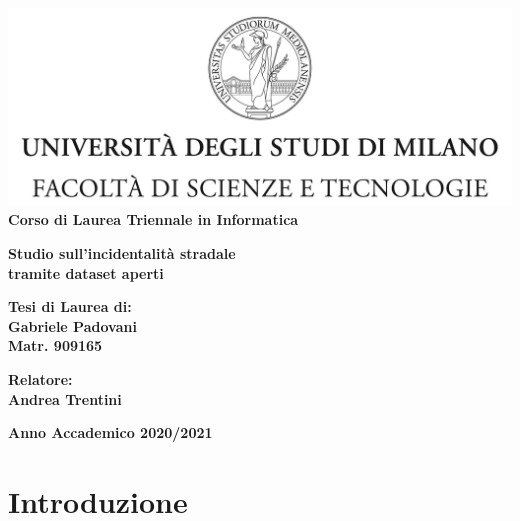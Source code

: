 \documentclass[a4paper]{report}
\begin{document}
\begin{titlepage}
\begin{center}
\includegraphics[width=\textwidth]{Logo.jpg}\\
{\large{\bf Corso di Laurea Triennale in Informatica}}
\end{center}
\vspace{12mm}
\begin{center}
{\huge{\bf Studio sull'incidentalità stradale}}\\
\vspace{4mm}
{\huge{\bf tramite dataset aperti}}\\
\end{center}
\vspace{12mm}
\begin{flushright}
{\large{\bf Tesi di Laurea di:}}\\
{\large{\bf Gabriele Padovani}}\\
{\large{\bf Matr. 909165}}\\
\end{flushright}
\vspace{4mm}
\begin{flushleft}
{\large{\bf Relatore:}}\\
{\large{\bf Andrea Trentini}}\\
\end{flushleft}
\vspace{12mm}
\begin{center}
{\large{\bf Anno Accademico 2020/2021}}
\end{center}
\end{titlepage}


\tableofcontents

\listoftodos

\chapter{Introduzione}
\end{document}
